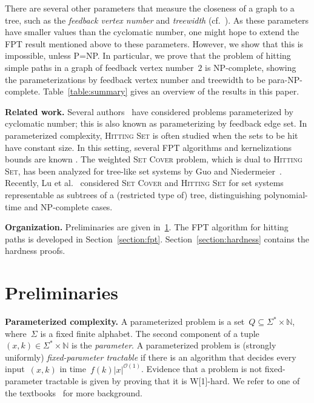 \let\accentvec\vec  \documentclass{llncs}
\newcommand{\Oh}{{\mathcal{O}}}
\newcommand{\HittingSet}{\textsc{Hitting Set}\xspace}
\newcommand{\SetCover}{\textsc{Set Cover}\xspace}
\begin{document}
There are several other parameters that measure the closeness of a graph to a tree, such as the \emph{feedback vertex number} and \emph{treewidth} (cf.~\cite{FellowsJR13}). As these parameters have smaller values than the cyclomatic number, one might hope to extend the FPT result mentioned above to these parameters. However, we show that this is impossible, unless P=NP. In particular, we prove that the problem of hitting simple paths in a graph of feedback vertex number~$2$ is NP-complete, showing the parameterizations by feedback vertex number and treewidth to be para-NP-complete. Table~\ref{table:summary} gives an overview of the results in this paper.

\textbf{Related work.} Several authors~\cite{CoppersmithV85,Fiala01,UhlmannW13} have considered problems parameterized by cyclomatic number; this is also known as parameterizing by feedback edge set. In parameterized complexity, \HittingSet is often studied when the sets to be hit have constant size. In this setting, several FPT algorithms and kernelizations bounds are known \cite{Abu-Khzam10,DellM14,Wahlstrom07}. The weighted \SetCover problem, which is dual to \HittingSet, has been analyzed for tree-like set systems by Guo and Niedermeier~\cite{GuoN06}. Recently, Lu et al.~\cite{LuLTLX14} considered \SetCover and \HittingSet for set systems representable as subtrees of a (restricted type of) tree, distinguishing polynomial-time and NP-complete cases.

\textbf{Organization.} Preliminaries are given in~\ref{section:prelims}. The FPT algorithm for hitting paths is developed in Section~\ref{section:fpt}. Section~\ref{section:hardness} contains the hardness proofs.

\section{Preliminaries} \label{section:prelims}

\textbf{Parameterized complexity.}
A parameterized problem is a set~$Q \subseteq \Sigma^* \times \mathbb{N}$, where~$\Sigma$ is a fixed finite alphabet. The second component of a tuple~$(x,k) \in \Sigma^* \times \mathbb{N}$ is the \emph{parameter}. A parameterized problem is (strongly uniformly) \emph{fixed-parameter tractable} if there is an algorithm that decides every input~$(x,k)$ in time~$f(k)|x|^{\Oh(1)}$. Evidence that a problem is not fixed-parameter tractable is given by proving that it is W[1]-hard. We refer to one of the textbooks~\cite{DowneyF13,FlumG06} for more background.
\end{document}
